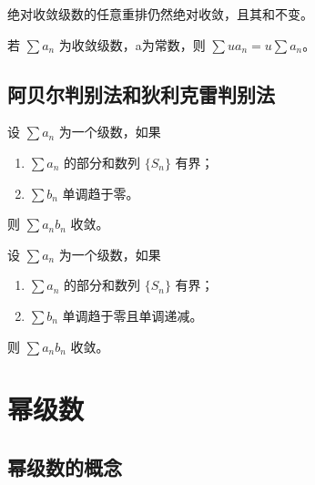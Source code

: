 \begin{theorem}
    绝对收敛级数的任意重排仍然绝对收敛，且其和不变。
\end{theorem}

\begin{theorem}[级数的乘积]
    若 $\sum a_{n}$ 为收敛级数，a为常数，则 $\sum u a_{n} = u \sum a_{n}$。
\end{theorem}


\subsection{阿贝尔判别法和狄利克雷判别法}

\begin{theorem}[阿贝尔判别法]
    设 $\sum a_{n}$ 为一个级数，如果
    \begin{enumerate}
        \item $\sum a_{n}$ 的部分和数列 $\{S_{n}\}$ 有界；
        \item $\sum b_{n}$ 单调趋于零。
    \end{enumerate}
    则 $\sum a_{n} b_{n}$ 收敛。
\end{theorem}

\begin{theorem}[狄利克雷判别法]
    设 $\sum a_{n}$ 为一个级数，如果
    \begin{enumerate}
        \item $\sum a_{n}$ 的部分和数列 $\{S_{n}\}$ 有界；
        \item $\sum b_{n}$ 单调趋于零且单调递减。
    \end{enumerate}
    则 $\sum a_{n} b_{n}$ 收敛。
\end{theorem}

\section{幂级数}

\subsection{幂级数的概念}

